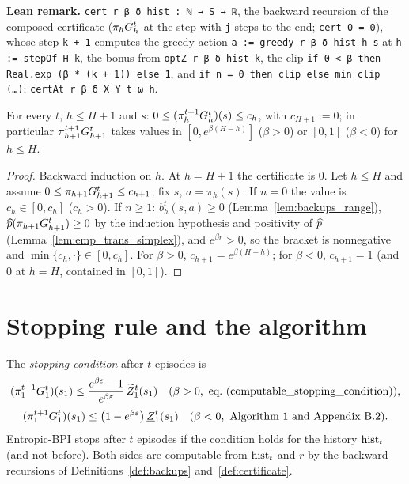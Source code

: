 \textbf{Lean remark.} \texttt{cert r β δ hist : ℕ → S → ℝ}, the backward recursion of the
composed certificate ($\pi_h G^t_h$ at the step with \texttt{j} steps to the end;
\texttt{cert 0 = 0}), whose step \texttt{k + 1} computes the greedy action
\texttt{a := greedy r β δ hist h s} at \texttt{h := stepOf H k}, the bonus from
\texttt{optZ r β δ hist k}, the clip \texttt{if 0 < β then Real.exp (β * (k + 1)) else 1}, and
\texttt{if n = 0 then clip else min clip (…)}; \texttt{certAt r β δ X Y t ω h}.

\begin{lemma}\label{lem:certificate_range}
\leanok
{}
For every $t$, $h \le H + 1$ and $s$: $0 \le (\pi^{t+1}_h G^t_h)(s) \le c_h$, with
$c_{H+1} := 0$; in particular $\pi^{t+1}_{h+1}G^t_{h+1}$ takes values in $[0, e^{\beta(H - h)}]$
($\beta > 0$) or $[0, 1]$ ($\beta < 0$) for $h \le H$.
\end{lemma}

\begin{proof}
\leanok
Backward induction on $h$. At $h = H + 1$ the certificate is $0$. Let $h \le H$ and assume
$0 \le \pi_{h+1}G^t_{h+1} \le c_{h+1}$; fix $s$, $a = \pi_h(s)$. If $n = 0$ the value is $c_h \in [0, c_h]$
($c_h > 0$). If $n \ge 1$: $b_h^t(s, a) \ge 0$ (Lemma~\ref{lem:backups_range}),
$\widehat{p}(\pi_{h+1}G^t_{h+1}) \ge 0$ by the induction hypothesis and positivity of $\widehat{p}$
(Lemma~\ref{lem:emp_trans_simplex}), and $e^{\beta r} > 0$, so the bracket is nonnegative and
$\min\{c_h, \cdot\} \in [0, c_h]$. For $\beta > 0$, $c_{h+1} = e^{\beta(H - h)}$; for $\beta < 0$, $c_{h+1} = 1$
(and $0$ at $h = H$, contained in $[0, 1]$).
\end{proof}

\section{Stopping rule and the algorithm}
\label{sec:algorithm_alg}

\begin{definition}\label{def:stopping_rule}
\leanok
{}
The \emph{stopping condition} after $t$ episodes is
\[
  (\pi^{t+1}_1 G^t_1)(s_1) \le \frac{e^{\beta\varepsilon} - 1}{e^{\beta\varepsilon}}\, \widetilde{Z}^t_1(s_1)
  \quad (\beta > 0, \text{ eq.~(computable\_stopping\_condition)}),
\]
\[
  (\pi^{t+1}_1 G^t_1)(s_1) \le \big(1 - e^{\beta\varepsilon}\big)\, \underline{Z}^t_1(s_1)
  \quad (\beta < 0, \text{ Algorithm~1 and Appendix~B.2}).
\]
Entropic-BPI stops after $t$ episodes if the condition holds for the history $\mathrm{hist}_t$ (and not
before). Both sides are computable from $\mathrm{hist}_t$ and $r$ by the backward recursions of
Definitions~\ref{def:backups} and~\ref{def:certificate}.
\end{definition}

